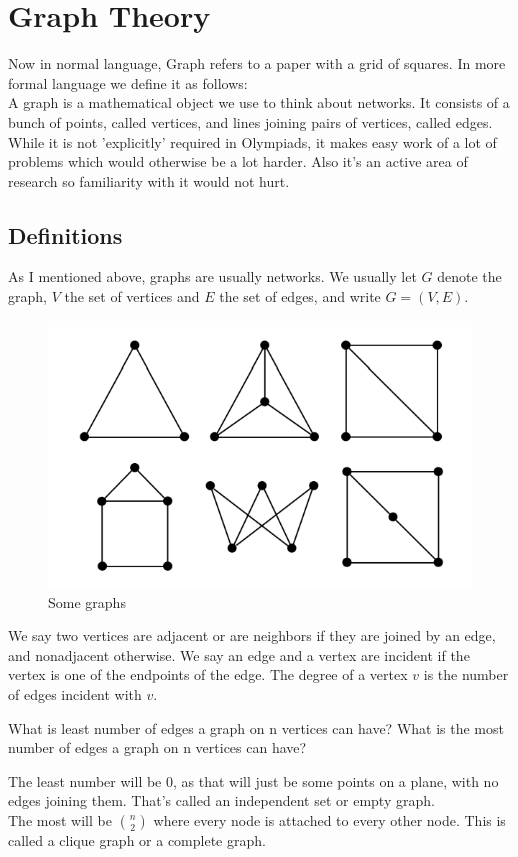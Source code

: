 \chapter{Graph Theory}
Now in normal language, Graph refers to a paper with a grid of squares. In more formal language we define it as follows:\\
A graph is a mathematical object we use to think about networks. It consists of a bunch of points, called vertices, and lines joining pairs of vertices, called edges.\\
While it is not 'explicitly' required in Olympiads, it makes easy work of a lot of problems which would otherwise be a lot harder. Also it's an active area of research so familiarity with it would not hurt.\\
\section{Definitions}
As I mentioned above, graphs are usually networks. We usually let $G$ denote the graph, $V$ the set of vertices and $E$ the set of edges, and write $G = (V, E)$.
\begin{figure}[h]
    \centering
    \includegraphics[width=0.5\linewidth]{Photos/Small graphs.png}
    \caption{Some graphs}
\end{figure}
We say two vertices are adjacent or are neighbors if they are joined by an edge, and nonadjacent otherwise. We say an edge and a vertex are incident if the vertex is one of the endpoints of the edge. The degree of a vertex $v$ is the number of edges incident with $v$.\\
\begin{example}
    What is least number of edges a graph on n vertices can have? What is the most number of edges a graph on n vertices can have?
\end{example}
The least number will be 0, as that will just be some points on a plane, with no edges joining them. That's called an independent set or empty graph.\\
The most will be $\binom{n}{2}$ where every node is attached to every other node. This is called a clique graph or a complete graph.\\
